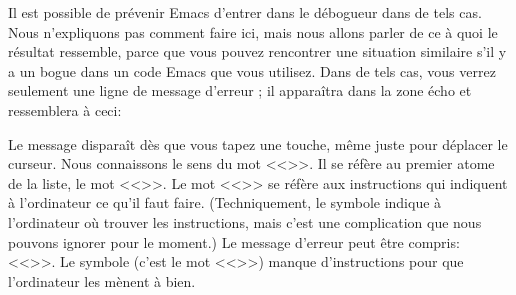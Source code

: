 Il est possible de prévenir Emacs d'entrer dans le débogueur dans de
tels cas. Nous n'expliquons pas comment faire ici, mais nous allons
parler de ce à quoi le résultat ressemble, parce que vous pouvez
rencontrer une situation similaire s'il y a un bogue dans un code
Emacs que vous utilisez. Dans de tels cas, vous verrez seulement une
ligne de message d'erreur ; il apparaîtra dans la zone écho et
ressemblera à ceci:
\begin{center}
\end{center}

Le message disparaît dès que vous tapez une touche, même juste pour
déplacer le curseur. Nous connaissons le sens du mot
<<>>. Il se réfère au premier atome de la liste, le mot
<<>>. Le mot <<>> se réfère aux instructions qui
indiquent à l'ordinateur ce qu'il faut faire. (Techniquement, le
symbole indique à l'ordinateur où trouver les instructions, mais c'est
une complication que nous pouvons ignorer pour le moment.) Le message
d'erreur peut être compris: <<>>. Le symbole (c'est le mot <<>>) manque
d'instructions pour que l'ordinateur les mènent à bien. 


